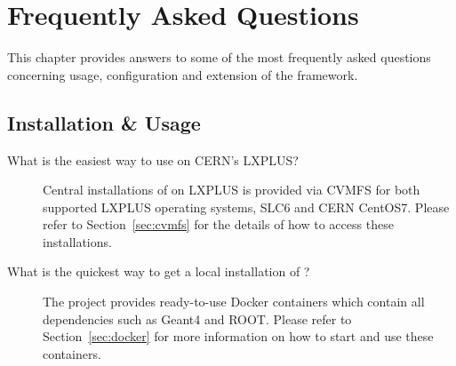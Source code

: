 \chapter{Frequently Asked Questions}
\label{ch:faq}

This chapter provides answers to some of the most frequently asked questions concerning usage, configuration and extension of the \apsq framework.

\section{Installation \& Usage}

\begin{description}
\item[What is the easiest way to use \apsq on CERN's LXPLUS?]
Central installations of \apsq on LXPLUS is provided via CVMFS for both supported LXPLUS operating systems, SLC6 and CERN CentOS7. Please refer to Section~\ref{sec:cvmfs} for the details of how to access these installations.
\item[What is the quickest way to get a local installation of \apsq?]
The project provides ready-to-use Docker containers which contain all dependencies such as Geant4 and ROOT. Please refer to Section~\ref{sec:docker} for more information on how to start and use these containers.
\end{description}

